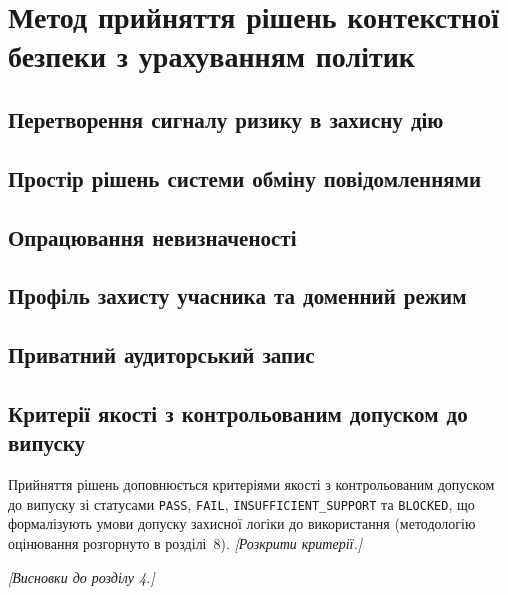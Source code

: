 \chapter{Метод прийняття рішень контекстної безпеки з урахуванням політик}
\label{ch:policy}


\section{Перетворення сигналу ризику в захисну дію}
\label{sec:signal-to-action}

\section{Простір рішень системи обміну повідомленнями}
\label{sec:decision-surface}

\section{Опрацювання невизначеності}
\label{sec:uncertainty}

\section{Профіль захисту учасника та доменний режим}
\label{sec:protection-profile}

\section{Приватний аудиторський запис}
\label{sec:audit-record}

\section{Критерії якості з контрольованим допуском до випуску}
\label{sec:release-gates}
Прийняття рішень доповнюється критеріями якості з контрольованим допуском до випуску зі статусами \texttt{PASS}, \texttt{FAIL}, \texttt{INSUFFICIENT\_SUPPORT} та \texttt{BLOCKED}, що формалізують умови допуску захисної логіки до використання (методологію оцінювання розгорнуто в розділі~8). \emph{[Розкрити критерії.]}

\emph{[Висновки до розділу 4.]}
